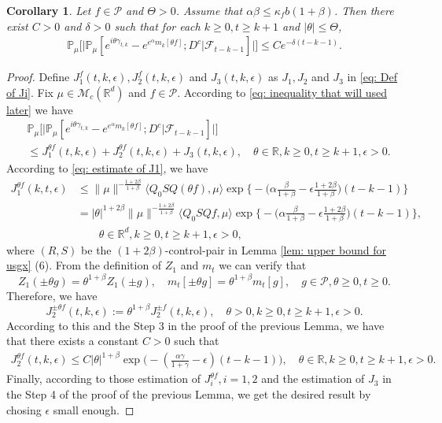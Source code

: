 \documentclass[12pt,oneside,english]{amsart}
\theoremstyle{plain}
\newtheorem{cor}[thm]{Corollary}
\theoremstyle{definition}
\numberwithin{equation}{section}
\begin{document}
\begin{cor}\label{cor: used in next corollary}
Let $f\in \mathcal{P}$ and $\Theta >0$.
Assume that $\alpha\beta\leq \kappa_fb(1+\beta)$.
Then there exist $C>0$ and $\delta>0$ such that for each $k \geq 0, t\geq k+1$ and $|\theta|\leq \Theta$,
\begin{align}
    \mathbb{P}_{\mu}\Big[\big|\mathbb{P}_{\mu}[e^{i\theta\gamma_{t,k}}-e^{e^{\alpha}m_k[\theta f]}; D^c | \mathscr F_{t-k-1}]\big|\Big]\leq Ce^{-\delta(t-k-1)}.
\end{align}
\end{cor}
\begin{proof}
	Define $J_1^f(t,k,\epsilon), J_2^f(t,k,\epsilon)$ and $J_3(t,k,\epsilon)$ as $J_1, J_2$ and $J_3$ in \eqref{eq: Def of Ji}.
	Fix $\mu \in \mathcal M_c(\mathbb R^d)$ and $f\in \mathcal P$.
    According to \eqref{eq: inequality that will used later} we have
\begin{align}
    &\mathbb{P}_{\mu}\Big[\big| \mathbb{P}_{\mu}[e^{i\theta \gamma_{t,k}}-e^{e^{\alpha}m_k[\theta f]}; D^c | \mathscr F_{t-k-1}]\big|\Big]
    \\&\leq J^{\theta f}_1(t,k,\epsilon) + J^{\theta f}_2(t,k,\epsilon)+J_3(t,k,\epsilon),
    \quad \theta\in \mathbb R, k\geq 0, t\geq k+1, \epsilon> 0.
\end{align}
	According to \eqref{eq: estimate of J1}, we have
\begin{align}
	J^{\theta f}_1(k,t,\epsilon)
     & \leq \|\mu\|^{-\frac{1+2\beta}{1+\beta}} \langle Q_0 SQ (\theta f), \mu \rangle \exp\Big\{-\Big(\alpha\frac{\beta}{1+\beta}-\epsilon\frac{1+2\beta}{1+\beta}\Big)(t-k-1)\Big\}
     \\& = |\theta|^{1+2\beta} \|\mu\|^{-\frac{1+2\beta}{1+\beta}} \langle Q_0 SQf, \mu \rangle \exp\Big\{-\Big(\alpha\frac{\beta}{1+\beta}-\epsilon\frac{1+2\beta}{1+\beta}\Big)(t-k-1)\Big\},
     \\ &\qquad \theta \in \mathbb R^d, k\geq 0, t\geq k+1, \epsilon > 0,
\end{align}
	where $(R,S)$ be the $(1+2\beta)$-control-pair in Lemma \ref{lem: upper bound for usgx} (6).
	From the definition of $Z_1$ and $m_t$ we can verify that
\[
	Z_1( \pm \theta g) = \theta^{1+\beta} Z_1(\pm g), \quad m_t[\pm \theta g] = \theta^{1+\beta} m_t[g],\quad g\in \mathcal P, \theta \geq 0, t\geq 0.
\]
	Therefore, we have
\[
J^{\pm \theta f}_2(t,k,\epsilon)
	:= \theta^{1+\beta} J_2^{\pm f}(t,k,\epsilon), \quad \theta >0, k \geq 0, t\geq k+1, \epsilon > 0.
\]
	According to this and the Step 3 in the proof of the previous Lemma, we have that there exists a constant $C > 0$ such that
\begin{align}
\label{eq:31step3}
    J^{\theta f}_2(t,k,\epsilon)
    \leq C |\theta|^{1+\beta}\exp\Big(-(\frac{\alpha\gamma}{1+\gamma}-\epsilon)(t-k-1)\Big),
    \quad \theta \in \mathbb R, k\geq 0, t\geq k+1, \epsilon >0.
\end{align}
	Finally, according to those estimation of $J^{\theta f}_{i}, i = 1,2$ and the estimation of $J_3$ in the Step 4 of the proof of the previous Lemma, we get the desired result by chosing $\epsilon$ small enough.
\end{proof}
\end{document}
